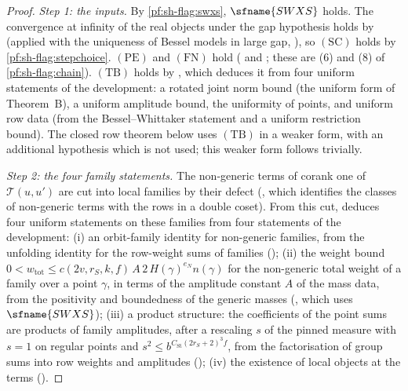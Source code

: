 \begin{proof}
\emph{Step 1: the inputs.} By \cref{pf:sh-flag:swxs}, $\sfname{SWXS}$ holds. The convergence at infinity of the
real objects under the gap hypothesis holds by 
(applied with the uniqueness of Bessel models in large gap, ), so
$(\mathrm{SC})$ holds by \cref{pf:sh-flag:stepchoice}. $(\mathrm{PE})$ and $(\mathrm{FN})$ hold
( and ; these are (6) and (8) of
\cref{pf:sh-flag:chain}). $(\mathrm{TB})$
holds by , which deduces it from four
uniform statements of the development: a rotated joint norm bound (the uniform form of Theorem~B), a uniform
amplitude bound, the uniformity of points, and uniform row data (from the Bessel--Whittaker statement and a
uniform restriction bound). The closed row theorem below uses $(\mathrm{TB})$ in a weaker form, with an
additional hypothesis which is not used; this weaker form follows trivially.

\emph{Step 2: the four family statements.} The non-generic terms of corank one of $\mathcal T(u,u')$ are cut into
local families by their defect (, which
identifies the classes of non-generic terms with the rows in a double coset). From this cut,
 deduces four uniform statements on these
families from four statements of the development: (i) an orbit-family identity for non-generic families, from the
unfolding identity for the row-weight sums of families
(); (ii) the weight bound
$0<w_{\mathrm{tot}}\le c(2v,r_S,k,f)\,A\,2\,H(\gamma)^{e_N}n(\gamma)$ for the non-generic total weight of a family over
a point $\gamma$, in terms of the amplitude constant $A$ of the mass data, from the positivity and boundedness of
the generic masses (, which uses $\sfname{SWXS}$);
(iii) a product structure: the coefficients of the point sums are products of family amplitudes, after a
rescaling $s$ of the pinned measure with $s=1$ on regular points and $s^2\le b^{C_{\mathrm{St}}(2r_S+2)^3f}$, from
the factorisation of group sums into row weights and amplitudes
(); (iv) the existence of local objects at
the terms ().


\end{proof}
